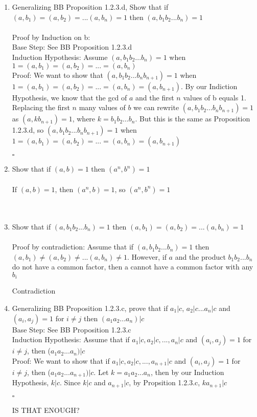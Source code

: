 \documentclass[11pt]{article}
\begin{document}
\begin{enumerate}
\begin{enumerate}
\item Generalizing BB Proposition 1.2.3.d, Show that if $(a,b_1)=(a,b_2)=... (a,b_n)=1$ then $(a,b_1 b_2 ... b_n) = 1$\\
\\
Proof by Induction on b:\\
Base Step: See BB Proposition 1.2.3.d
\\
Induction Hypothesis: Assume $(a,b_1b_2...b_n) = 1$ when $1 = (a,b_1) = (a,b_2) = ... = (a,b_n)$
\\
Proof: We want to show that $(a,b_1b_2...b_nb_{n+1}) = 1$ when $1 = (a,b_1) = (a,b_2) = ... = (a,b_n) = (a,b_{n+1})$.  By our Indiction Hypothesis, we know that the gcd of $a$ and the first $n$ values of b equals 1.  Replacing the first $n$ many values of $b$ we can rewrite $(a,b_1b_2...b_nb_{n+1}) = 1$ as $(a,kb_{n+1}) = 1$, where $k = b_1b_2...b_n$.  But this is the same as Proposition 1.2.3.d, so $(a,b_1b_2...b_nb_{n+1}) = 1$ when $1 = (a,b_1) = (a,b_2) = ... = (a,b_n) = (a,b_{n+1})$
\begin{flushright} $\square$
\end{flushright}

\item Show that if $(a, b) = 1$ then $(a^n, b^n) = 1$\\
\\
If $(a,b) = 1$, then $(a^n,b) = 1$, so $(a^n,b^n) = 1$
\\
\\
\\
\item Show that if $(a, b_1 b_2...b_n) = 1$ then $(a, b_1) = (a, b_2) = ... (a,b_n) = 1$\\
\\
Proof by contradiction: Assume that if $(a, b_1 b_2...b_n) = 1$ then $(a, b_1) \neq (a, b_2) \neq ... (a,b_n) \neq 1$.  However, if $a$ and the product $b_1b_2...b_n$ do not have a common factor, then a cannot have a common factor with any $b_i$

\begin{flushright} Contradiction
\end{flushright}
\item Generalizing BB Proposition 1.2.3.c, prove that if $a_1 | c$, $a_2| c$...$a_n|c$ and $(a_i, a_j) = 1$ for $i \neq j$ then $(a_1 a_2...a_n)|c$
\\
Base Step: See BB Proposition 1.2.3.c
\\
Induction Hypothesis: Assume that if $a_1|c, a_2|c,...,a_n|c$ and $(a_i,a_j) = 1$ for $i \neq j$, then ($a_1a_2...a_n)|c$
\\
Proof: We want to show that if $a_1|c, a_2|c,...,a_{n+1}|c$ and $(a_i,a_j) = 1$ for $i \neq j$, then ($a_1a_2...a_{n+1})|c$.  Let $k = a_1a_2...a_n$, then by our Induction Hypothesis, $k|c$.  Since $k|c$ and $a_{n+1}|c$, by Propsition 1.2.3.c, $ka_{n+1}|c$
\begin{flushright}$\square$
\end{flushright}
IS THAT ENOUGH?
\end{enumerate}


\end{enumerate}
\end{document}
